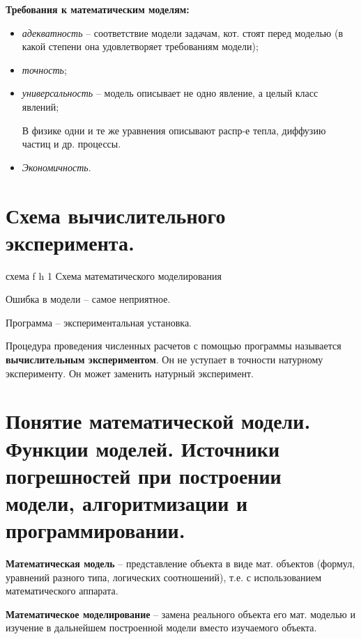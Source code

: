 \textbf{Требования к математическим моделям:}

\begin{itemize}[label*=--]
	\item \textit{адекватность} -- соответствие модели задачам, кот. стоят перед моделью (в какой степени она удовлетворяет требованиям модели);
	
	\item \textit{точность};
	
	\item \textit{универсальность} -- модель описывает не одно явление, а целый класс явлений;
	
	В физике одни и те же уравнения описывают распр-е тепла, диффузию частиц и др. процессы.
	
	\item \textit{Экономичность}.
\end{itemize}


\section*{Схема вычислительного эксперимента.} %

{схема} %
{f} %
{h} %
{1\textwidth} %
{Схема математического моделирования} %

Ошибка в модели -- самое неприятное.

Программа -- экспериментальная установка.

Процедура проведения численных расчетов с помощью программы называется \textbf{вычислительным экспериментом}. Он не уступает в точности натурному эксперименту. Он может заменить натурный эксперимент.

\section*{Понятие математической модели. Функции моделей. Источники погрешностей при построении модели, алгоритмизации и программировании.} %

\textbf{Математическая модель} -- представление объекта в виде мат. объектов (формул, уравнений разного типа, логических соотношений), т.е. с использованием математического аппарата.

\textbf{Математическое моделирование} -- замена реального объекта его мат. моделью и изучение в дальнейшем построенной модели вместо изучаемого объекта.

